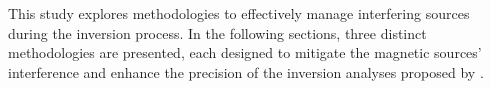 
This study explores methodologies to effectively manage interfering sources during the inversion process. In the following sections, three distinct methodologies are presented, each designed to mitigate the magnetic sources' interference and enhance the precision of the inversion analyses proposed by \citet{Souza-Junior2023b}.





    
    



